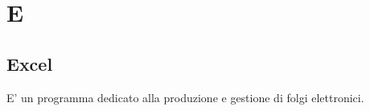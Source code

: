 \section{E}
\subsection{Excel}%
E' un programma dedicato alla produzione e gestione di folgi elettronici.
\clearpage
